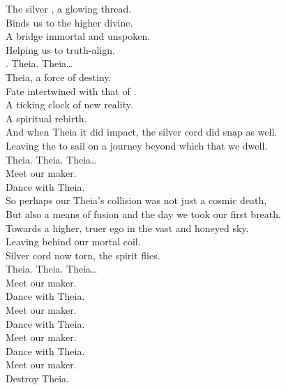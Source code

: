 
\label{album:the-silver-cord}



The silver , a glowing thread. \\
Binds us to the higher divine. \\
A bridge immortal and unspoken. \\
Helping us to truth-align. \\

. Theia. Theia… \\

Theia, a force of destiny. \\
Fate intertwined with that of . \\
A ticking clock of new reality. \\
A spiritual rebirth. \\
And when Theia it did impact, the silver cord did snap as well. \\
Leaving the  to sail on a journey beyond which that we dwell. \\

Theia. Theia. Theia… \\

Meet our maker. \\
Dance with Theia. \\

So perhaps our Theia's collision was not just a cosmic death, \\
But also a means of fusion and the day we took our first breath. \\
Towards a higher, truer ego in the vast and honeyed sky. \\
Leaving behind our mortal coil. \\
Silver cord now torn, the spirit flies. \\

Theia. Theia. Theia… \\

Meet our maker. \\
Dance with Theia. \\
Meet our maker. \\
Dance with Theia. \\
Meet our maker. \\
Dance with Theia. \\
Meet our maker. \\
Destroy Theia. \\

